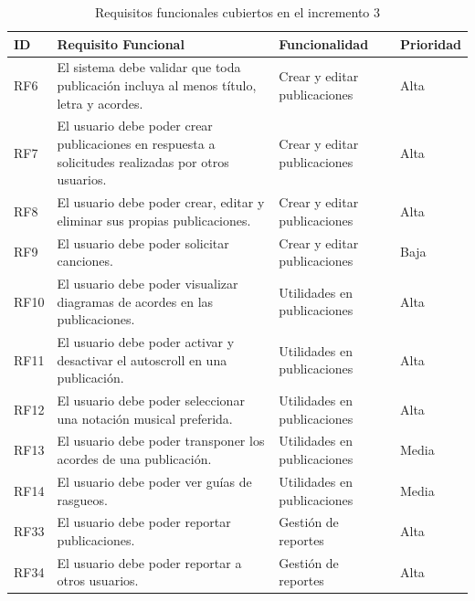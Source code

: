 \begin{table}[H]
    \centering
    \scriptsize
    \begin{tabular}{l p{} p{} l}
        \textbf{ID} & \textbf{Requisito Funcional} & \textbf{Funcionalidad} & \textbf{Prioridad} \\ \hline
        RF6  & El sistema debe validar que toda publicación incluya al menos título, letra y acordes. & Crear y editar publicaciones & Alta \\ \hline
        RF7  & El usuario debe poder crear publicaciones en respuesta a solicitudes realizadas por otros usuarios. & Crear y editar publicaciones & Alta \\ \hline
        RF8  & El usuario debe poder crear, editar y eliminar sus propias publicaciones. & Crear y editar publicaciones & Alta \\ \hline
        RF9  & El usuario debe poder solicitar canciones. & Crear y editar publicaciones & Baja \\ \hline
        RF10 & El usuario debe poder visualizar diagramas de acordes en las publicaciones. & Utilidades en publicaciones & Alta \\ \hline
        RF11 & El usuario debe poder activar y desactivar el autoscroll en una publicación. & Utilidades en publicaciones & Alta \\ \hline
        RF12 & El usuario debe poder seleccionar una notación musical preferida. & Utilidades en publicaciones & Alta \\ \hline
        RF13 & El usuario debe poder transponer los acordes de una publicación. & Utilidades en publicaciones & Media \\ \hline
        RF14 & El usuario debe poder ver guías de rasgueos. & Utilidades en publicaciones & Media \\ \hline
        RF33 & El usuario debe poder reportar publicaciones. & Gestión de reportes & Alta \\ \hline
        RF34 & El usuario debe poder reportar a otros usuarios. & Gestión de reportes & Alta \\ \hline
    \end{tabular}
    \caption{Requisitos funcionales cubiertos en el incremento 3}
    \label{tab:requisitosfuncionalesincremento3}
\end{table}

